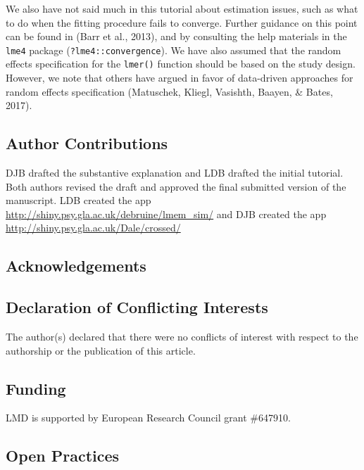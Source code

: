 \documentclass[man,floatsintext]{apa6}
\begin{document}
We also have not said much in this tutorial about estimation issues, such as what to do when the fitting procedure fails to converge. Further guidance on this point can be found in (Barr et al., 2013), and by consulting the help materials in the \texttt{lme4} package (\texttt{?lme4::convergence}). We have also assumed that the random effects specification for the \texttt{lmer()} function should be based on the study design. However, we note that others have argued in favor of data-driven approaches for random effects specification (Matuschek, Kliegl, Vasishth, Baayen, \& Bates, 2017).

\hypertarget{author-contributions}{%
\subsection{Author Contributions}\label{author-contributions}}

DJB drafted the substantive explanation and LDB drafted the initial tutorial. Both authors revised the draft and approved the final submitted version of the manuscript. LDB created the app \url{http://shiny.psy.gla.ac.uk/debruine/lmem_sim/} and DJB created the app \url{http://shiny.psy.gla.ac.uk/Dale/crossed/}

\hypertarget{acknowledgements}{%
\subsection{Acknowledgements}\label{acknowledgements}}

\hypertarget{declaration-of-conflicting-interests}{%
\subsection{Declaration of Conflicting Interests}\label{declaration-of-conflicting-interests}}

The author(s) declared that there were no conflicts of interest with respect to the authorship or the publication of this article.

\hypertarget{funding}{%
\subsection{Funding}\label{funding}}

LMD is supported by European Research Council grant \#647910.

\hypertarget{open-practices}{%
\subsection{Open Practices}\label{open-practices}}
\end{document}
